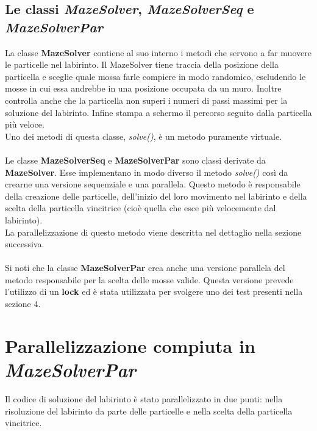 \documentclass[10pt,twocolumn,letterpaper]{article}
\begin{document}
\subsection{Le classi \textit{MazeSolver}, \textit{MazeSolverSeq} e \textit{MazeSolverPar}}
La classe \textbf{MazeSolver} contiene al suo interno i metodi che servono a far muovere le particelle nel labirinto. Il MazeSolver tiene traccia della posizione della particella e sceglie quale mossa farle compiere in modo randomico, escludendo le mosse in cui essa andrebbe in una posizione occupata da un muro. Inoltre controlla anche che la particella non superi i numeri di passi massimi per la soluzione del labirinto. Infine stampa a schermo il percorso seguito dalla particella più veloce.\\
Uno dei metodi di questa classe, \textit{solve()}, è un metodo puramente virtuale.\\
\\
Le classe \textbf{MazeSolverSeq} e \textbf{MazeSolverPar} sono classi derivate da \textbf{MazeSolver}. Esse implementano in modo diverso il metodo \textit{solve()} così da crearne una versione sequenziale e una parallela. Questo metodo è responsabile della creazione delle particelle, dell'inizio del loro movimento nel labirinto e della scelta della particella vincitrice (cioè quella che esce più velocemente dal labirinto).\\
La parallelizzazione di questo metodo viene descritta nel dettaglio nella sezione successiva.\\
\\
Si noti che la classe \textbf{MazeSolverPar} crea anche una versione parallela del metodo responsabile per la scelta delle mosse valide. Questa versione prevede l'utilizzo di un \textbf{lock} ed è stata utilizzata per svolgere uno dei test presenti nella sezione 4.

\section{Parallelizzazione compiuta in \textit{MazeSolverPar}}
Il codice di soluzione del labirinto è stato parallelizzato in due punti: nella risoluzione del labirinto da parte delle particelle e nella scelta della particella vincitrice.
\end{document}
